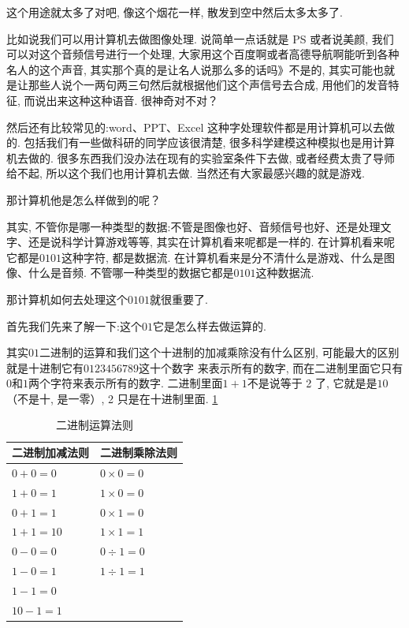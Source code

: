 这个用途就太多了对吧, 像这个烟花一样, 散发到空中然后太多太多了. 

比如说我们可以用计算机去做图像处理. 说简单一点话就是 PS 或者说美颜, 我们可以对这个音频信号进行一个处理, 大家用这个百度啊或者高德导航啊能听到各种名人的这个声音, 其实那个真的是让名人说那么多的话吗》不是的, 其实可能也就是让那些人说个一两句两三句然后就根据他们这个声信号去合成, 用他们的发音特征, 而说出来这种这种语音. 很神奇对不对？

然后还有比较常见的:word、PPT、Excel 这种字处理软件都是用计算机可以去做的. 包括我们有一些做科研的同学应该很清楚, 很多科学建模这种模拟也是用计算机去做的. 很多东西我们没办法在现有的实验室条件下去做, 或者经费太贵了导师给不起, 所以这个我们也用计算机去做. 当然还有大家最感兴趣的就是游戏. 

那计算机他是怎么样做到的呢？

其实, 不管你是哪一种类型的数据:不管是图像也好、音频信号也好、还是处理文字、还是说科学计算游戏等等, 其实在计算机看来呢都是一样的. 在计算机看来呢它都是$0101$这种字符, 都是数据流. 在计算机看来是分不清什么是游戏、什么是图像、什么是音频. 不管哪一种类型的数据它都是$0101$这种数据流. 

那计算机如何去处理这个$0101$就很重要了. 

首先我们先来了解一下:这个$01$它是怎么样去做运算的. 

其实$01$二进制的运算和我们这个十进制的加减乘除没有什么区别, 可能最大的区别就是十进制它有$0123456789$这十个数字
来表示所有的数字, 而在二进制里面它只有$0$和$1$两个字符来表示所有的数字. 二进制里面$1+1$不是说等于 2 了, 它就是是$10$（不是十, 是一零）, 2 只是在十进制里面. \ref{tab:table2_1}

\begin{table}[ht]
  \centering
  \begin{tabular}{ll}
    \toprule
    二进制加减法则  & 二进制乘除法则 \\
    \midrule
    $0+0=0$ & $0 \times 0=0$ \\
    $1+0=1$ & $1 \times  0=0$  \\
    $0+1=1$ & $0 \times  1=0$  \\
    $1+1=10$  & $1 \times  1=1$  \\
    $0-0=0$ & $0 \div 1=0 $ \\
    $1-0=1$ & $1 \div 1=1$  \\
    $1-1=0$ & \\
    $10 - 1=1$ &  \\
    \bottomrule
  \end{tabular}
  \caption{ 二进制运算法则}
  \label{tab:table2_1}
\end{table}


